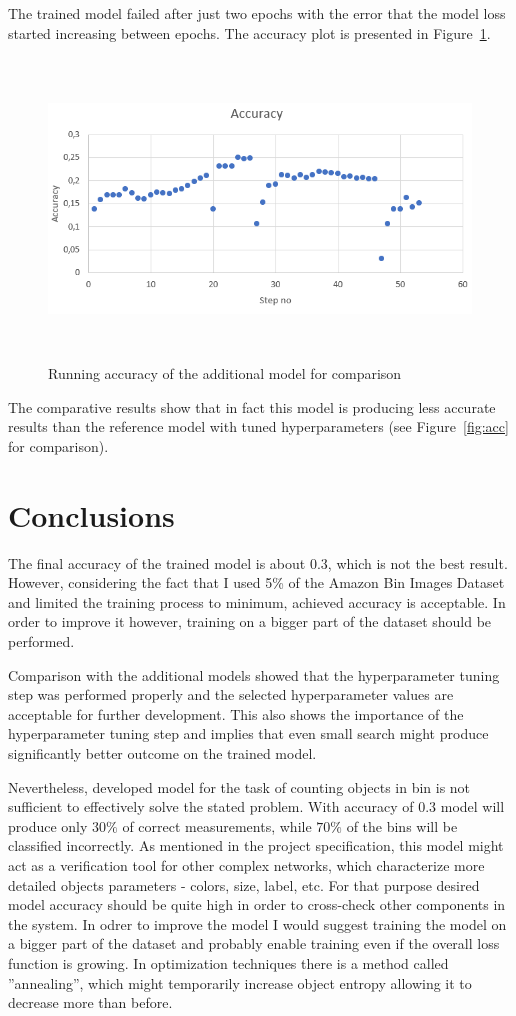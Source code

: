 \documentclass{article}
\begin{document}
The trained model failed after just two epochs with the error that the model loss started increasing between epochs.
The accuracy plot is presented in Figure~\ref{fig:acc2}.
\begin{figure}[ht]
	\centering
	\includegraphics[height=80mm]{accuracy_bad.png}
	\caption{Running accuracy of the additional model for comparison}
	\label{fig:acc2}
\end{figure}

The comparative results show that in fact this model is producing less accurate results than the reference model with tuned hyperparameters (see Figure~\ref{fig:acc} for comparison). 

\section{Conclusions}
The final accuracy of the trained model is about $0.3$, which is not the best result. However, considering the fact that I used 5\% of the Amazon Bin Images Dataset and limited the training process to minimum, achieved accuracy is acceptable. In order to improve it however, training on a bigger part of the dataset should be performed. 

Comparison with the additional models showed that the hyperparameter tuning step was performed properly and the selected hyperparameter values are acceptable for further development. This also shows the importance of the hyperparameter tuning step and implies that even small search might produce significantly better outcome on the trained model.

Nevertheless, developed model for the task of counting objects in bin is not sufficient to effectively solve the stated problem. With accuracy of $0.3$ model will produce only $30\%$ of correct measurements, while $70\%$ of the bins will be classified incorrectly. As mentioned in the project specification, this model might act as a verification tool for other complex networks, which characterize more detailed objects parameters - colors, size, label, etc. For that purpose desired model accuracy should be quite high in order to cross-check other components in the system. In odrer to improve the model I would suggest training the model on a bigger part of the dataset and probably enable training even if the overall loss function is growing. In optimization techniques there is a method called ''annealing'', which might temporarily increase object entropy allowing it to decrease more than before.
\end{document}
